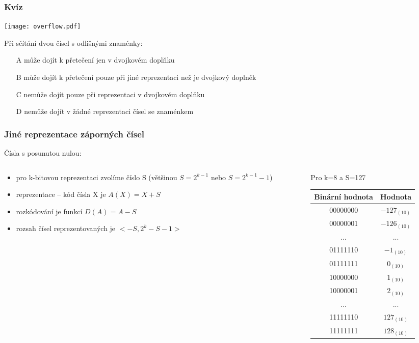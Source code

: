 \documentclass{beamer}
\begin{document}
\begin{frame}
\frametitle{Kvíz}

\begin{center}
\texttt{[image: overflow.pdf]}
\end{center}

Při sčítání dvou čísel s odlišnými znaménky:
\begin{itemize}
\item[A] může dojít k přetečení jen v dvojkovém doplňku
\item[B] může dojít k přetečení pouze při jiné reprezentaci než je dvojkový doplněk
\item[C] nemůže dojít pouze při reprezentaci v dvojkovém doplňku
\item[D] nemůže dojít v žádné reprezentaci čísel se znaménkem
\end{itemize}
\end{frame}



\begin{frame}
\frametitle{Jiné reprezentace záporných čísel}

Čísla s posunutou nulou:

\begin{columns}
\begin{column}{0.5\textwidth}
\begin{itemize}
\item pro k-bitovou reprezentaci zvolíme číslo S (většinou $S=2^{k-1}$ nebo $S=2^{k-1}-1$)
\item reprezentace -- kód čísla X je $A(X) = X+S$
\item rozkódování je funkcí $D(A) = A-S$
\item rozsah čísel reprezentovaných je $<-S, 2^{k}-S-1>$
\end{itemize}
\end{column}
\hfill
\begin{column}{0.5\textwidth}
Pro k=8 a S=127
\bigskip
\begin{tabular}{|c|c|}\hline
{\small Binární hodnota}  & {\small Hodnota} \\\hline
00000000 & $-127_{(10)}$ \\ \hline
00000001 & $-126_{(10)}$ \\ \hline
... & ... \\\hline
01111110 & $-1_{(10)}$ \\ \hline
01111111 & $0_{(10)}$ \\ \hline
10000000 & $1_{(10)}$ \\ \hline
10000001 & $2_{(10)}$ \\ \hline
... & ... \\\hline
11111110 & $127_{(10)}$ \\ \hline
11111111 & $128_{(10)}$ \\ \hline
\end{tabular}
\end{column}
\end{columns}

\end{frame}
\end{document}
